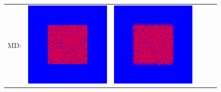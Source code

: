 \documentclass[12pt, reqno]{report}
\theoremstyle{definition}
\theoremstyle{remark}
\begin{document}
\begin{figure}[H]
\begin{tabular}{rccccc}
        MD: &
        \includegraphics[align = c, height=\subheight]{media_paper/diff0.png} & 
        \includegraphics[align = c, height=\subheight]{media_paper/diff50.png} & 

\end{tabular}
\end{figure}
\end{document}

